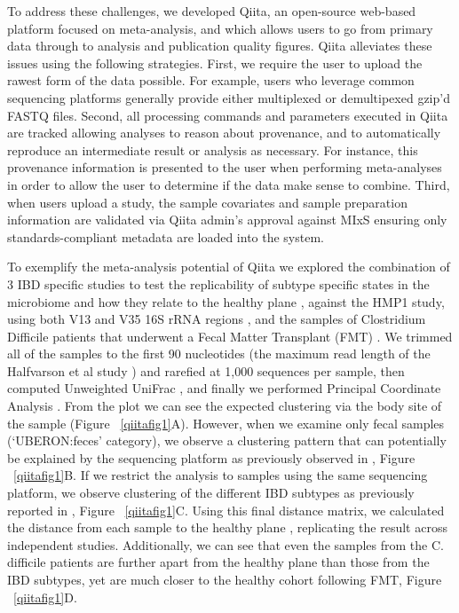 To address these challenges, we developed Qiita, an open-source web-based platform
focused on meta-analysis, and which allows users to go from primary data through to
analysis and publication quality figures. Qiita alleviates these issues using the
following strategies. First, we require the user to upload the rawest form of the
data possible. For example, users who leverage common sequencing platforms generally
provide either multiplexed or demultipexed gzip’d FASTQ files. Second, all processing
commands and parameters executed in Qiita are tracked allowing analyses to reason about
provenance, and to automatically reproduce an intermediate result or analysis as
necessary. For instance, this provenance information is presented to the user when
performing meta-analyses in order to allow the user to determine if the data make
sense to combine. Third, when users upload a study, the sample covariates and sample
preparation information are validated via Qiita admin’s approval against MIxS ensuring
only standards-compliant metadata are loaded into the system.

To exemplify the meta-analysis potential of Qiita we explored the combination of
3 IBD specific studies to test the replicability of subtype specific states in the
microbiome and how they relate to the healthy plane \cite{Halfvarson2017,Gevers2014},
against the HMP1 study, using both V13 and V35 16S rRNA regions \cite{Consortium2012},
and the samples of Clostridium Difficile patients that underwent a Fecal Matter
Transplant (FMT) \cite{Weingarden2015}. We trimmed all of the samples to the first
90 nucleotides (the maximum read length of the Halfvarson et al study \cite{Halfvarson2017})
and rarefied at 1,000 sequences per sample, then computed Unweighted UniFrac \cite{Lozupone2005},
and finally we performed Principal Coordinate Analysis \cite{Vazquez-Baeza2013}. From
the plot we can see the expected clustering via the body site of the sample (Figure ~\ref{qiitafig1}A).
However, when we examine only fecal samples (‘UBERON:feces’ category), we observe a clustering
pattern that can potentially be explained by the sequencing platform as previously observed
in \cite{Lozupone2013}, Figure ~\ref{qiitafig1}B. If we restrict the analysis to samples using
the same sequencing platform, we observe clustering of the different IBD subtypes as previously
reported in \cite{Gevers2014,Halfvarson2017}, Figure ~\ref{qiitafig1}C. Using this final
distance matrix, we calculated the distance from each sample to the healthy plane \cite{Halfvarson2017},
replicating the result across independent studies. Additionally, we can see that even the samples
from the C. difficile patients are further apart from the healthy plane than those from the IBD
subtypes, yet are much closer to the healthy cohort following FMT, Figure ~\ref{qiitafig1}D.

